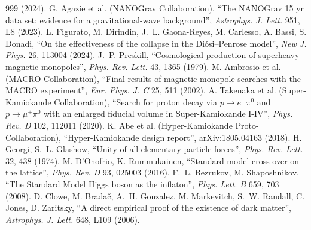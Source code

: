 \documentclass[11pt,a4paper]{article}
\theoremstyle{definition}
\theoremstyle{remark}
\theoremstyle{definition}
\begin{document}
\begin{thebibliography}{999}
(2024).
 G. Agazie et al. (NANOGrav Collaboration), ``The NANOGrav 15 yr data set: evidence for a gravitational-wave
background'', \emph{Astrophys. J. Lett.} 951, L8 (2023).
 L. Figurato, M. Dirindin, J.~L. Gaona-Reyes, M. Carlesso, A. Bassi, S. Donadi, ``On the effectiveness of the collapse
in the Di\'osi--Penrose model'', \emph{New J. Phys.} 26, 113004 (2024).
 J.~P. Preskill, ``Cosmological production of superheavy magnetic monopoles'', \emph{Phys. Rev. Lett.} 43, 1365 (1979).
 M. Ambrosio et al. (MACRO Collaboration), ``Final results of magnetic monopole searches with the MACRO experiment'',
\emph{Eur. Phys. J. C} 25, 511 (2002).
 A. Takenaka et al. (Super-Kamiokande Collaboration), ``Search for proton decay via $p\to e^+\pi^0$ and $p\to\mu^+\pi^0$
with an enlarged fiducial volume in Super-Kamiokande I-IV'', \emph{Phys. Rev. D} 102, 112011 (2020).
 K. Abe et al. (Hyper-Kamiokande Proto-Collaboration), ``Hyper-Kamiokande design report'', arXiv:1805.04163 (2018).
 H. Georgi, S.~L. Glashow, ``Unity of all elementary-particle forces'', \emph{Phys. Rev. Lett.} 32, 438 (1974).
 M. D'Onofrio, K. Rummukainen, ``Standard model cross-over on the lattice'', \emph{Phys. Rev. D} 93, 025003 (2016).
 F.~L. Bezrukov, M. Shaposhnikov, ``The Standard Model Higgs boson as the inflaton'', \emph{Phys. Lett. B} 659, 703
(2008).
 D. Clowe, M. Brada\v{c}, A.~H. Gonzalez, M. Markevitch, S.~W. Randall, C. Jones, D. Zaritsky, ``A direct empirical proof of
the existence of dark matter'', \emph{Astrophys. J. Lett.} 648, L109 (2006).
\end{thebibliography}
\end{document}
